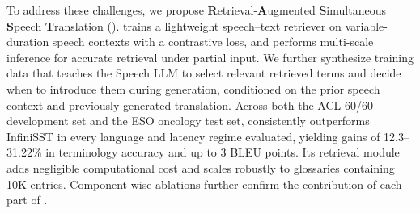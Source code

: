 To address these challenges, we propose \textbf{R}etrieval-\textbf{A}ugmented \textbf{S}imultaneous \textbf{S}peech \textbf{T}ranslation (\method). \method trains a lightweight speech--text retriever on variable-duration speech contexts with a contrastive loss, and performs multi-scale inference for accurate retrieval under partial input. We further synthesize training data that teaches the Speech LLM to select relevant retrieved terms and decide when to introduce them during generation, conditioned on the prior speech context and previously generated translation. 
Across both the ACL 60/60 development set and the ESO oncology test set, \method consistently outperforms InfiniSST in every language and latency regime evaluated, yielding gains of 12.3--31.22\% in terminology accuracy and up to 3 BLEU points. Its retrieval module adds negligible computational cost and scales robustly to glossaries containing 10K entries. Component-wise ablations further confirm the contribution of each part of \method.


